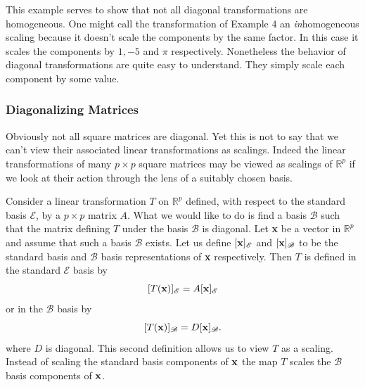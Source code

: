 \documentclass{book}
\begin{document}

This example serves to show that not all diagonal transformations are homogeneous. One might call the transformation of Example $4$ an \emph{in}homogeneous scaling because it doesn't scale the components by the same factor. In this case it scales the components by $1,-5$ and $\pi$ respectively. Nonetheless the behavior of diagonal transformations are quite easy to understand. They simply scale each component by some value.


\subsubsection{Diagonalizing Matrices} Obviously not all square matrices are diagonal. Yet this is not to say that we can't view their associated linear transformations as scalings. Indeed the linear transformations of many $p \times p$ square matrices may be viewed as scalings of $\mathbb{R}^p$ if we look at their action through the lens of a suitably chosen basis.

Consider a linear transformation $T$ on $\mathbb{R}^p$ defined, with respect to the standard basis $\mathscr{E}$, by a $p \times p$ matrix $A$. What we would like to do is find a basis $\mathscr{B}$ such that the matrix defining $T$ under the basis $\mathscr{B}$ is diagonal. Let {\bf x} be a vector in $\mathbb{R}^p$ and assume that such a basis $\mathscr{B}$ exists. Let us define $[{\bf x}]_\mathscr{E}$ and $[{\bf x}]_\mathscr{B}$ to be the standard basis and $\mathscr{B}$ basis representations of {\bf x} respectively. Then $T$ is defined in the standard $\mathscr{E}$ basis by 
$$
[T({\bf x})]_\mathscr{E}=A[{\bf x}]_\mathscr{E}
$$
or in the $\mathscr{B}$ basis by 
$$
[T({\bf x})]_\mathscr{B}=D[{\bf x}]_\mathscr{B}.
$$
where $D$ is diagonal. This second definition allows us to view $T$ as a scaling. Instead of scaling the standard basis components of ${\bf x}$ the map $T$ scales the $\mathscr{B}$ basis components of ${\bf x}$. 
\end{document}
